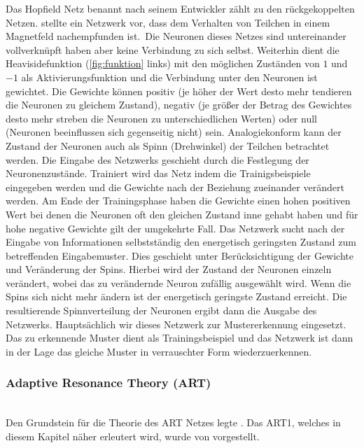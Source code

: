 Das Hopfield Netz benannt nach seinem Entwickler zählt zu den rückgekoppelten Netzen. \citet{HOPFIELD1986} stellte ein Netzwerk vor, dass dem Verhalten von Teilchen in einem Magnetfeld nachempfunden ist.\, Die Neuronen dieses Netzes sind untereinander vollverknüpft haben aber keine Verbindung zu sich selbst. Weiterhin dient die Heavisidefunktion (\autoref{fig:funktion} links) mit den möglichen Zuständen von $1$ und $-1$ als Aktivierungsfunktion und die Verbindung unter den Neuronen ist gewichtet. Die Gewichte können positiv (je höher der Wert desto mehr tendieren die Neuronen zu gleichem Zustand), negativ (je größer der Betrag des Gewichtes desto mehr streben die Neuronen zu unterschiedlichen Werten) oder null (Neuronen beeinflussen sich gegenseitig nicht) sein. Analogiekonform kann der Zustand der Neuronen auch als Spinn (Drehwinkel) der Teilchen betrachtet werden. Die Eingabe des Netzwerks geschieht durch die Festlegung der Neuronenzustände. Trainiert wird das Netz indem die Trainigsbeispiele eingegeben werden und die Gewichte nach der Beziehung zueinander verändert werden. Am Ende der Trainingsphase haben die Gewichte einen hohen positiven Wert bei denen die Neuronen oft den gleichen Zustand inne gehabt haben und für hohe negative Gewichte gilt der umgekehrte Fall. Das Netzwerk sucht nach der Eingabe von Informationen selbstständig den energetisch geringsten Zustand zum betreffenden Eingabemuster. Dies geschieht unter Berücksichtigung der Gewichte und Veränderung der Spins. Hierbei wird der Zustand der Neuronen einzeln verändert, wobei das zu verändernde Neuron zufällig ausgewählt wird. Wenn die Spins sich nicht mehr ändern ist der energetisch geringste Zustand erreicht. Die resultierende Spinnverteilung der Neuronen ergibt dann die Ausgabe des Netzwerks. Hauptsächlich wir dieses Netzwerk zur Mustererkennung eingesetzt. Das zu erkennende Muster dient als Trainingsbeispiel und das Netzwerk ist dann in der Lage das gleiche Muster in verrauschter Form wiederzuerkennen.


\subsubsection{Adaptive Resonance Theory (ART)}\\

Den Grundstein für die Theorie des ART Netzes legte \citet{Grossberg1973}. Das ART1, welches in diesem Kapitel näher erleutert wird, wurde von \citet{Carpenter1987} vorgestellt. 




